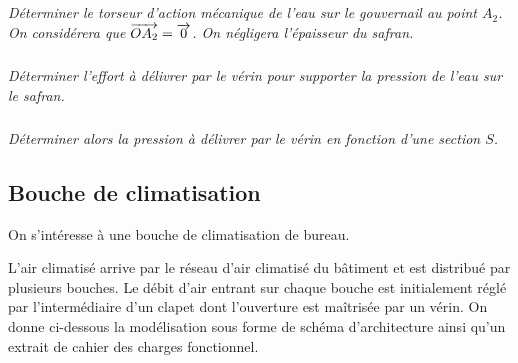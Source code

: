 \documentclass[10pt,fleqn]{article} %
\begin{document}
\begin{multicols}{2}

\subparagraph{}
\textit{Déterminer le torseur d'action mécanique de l'eau sur le gouvernail au point $A_2$. On considérera que $\overrightarrow{OA_2}=\overrightarrow{0}$. On négligera l'épaisseur du safran.} 

%
%
%
%


\subparagraph{}
\textit{Déterminer l'effort à délivrer par le vérin pour supporter la pression de l'eau sur le safran.}

\subparagraph{}
\textit{Déterminer alors la pression à délivrer par le vérin en fonction d'une section $S$.}


\subsection*{Bouche de climatisation}
\setcounter{exo}{0}
On s’intéresse à une bouche de climatisation de bureau.   

L’air climatisé arrive par le réseau d’air climatisé du bâtiment et est distribué par plusieurs bouches. Le débit d’air entrant sur chaque bouche est initialement réglé par l’intermédiaire d’un clapet dont l’ouverture est maîtrisée  par un vérin. On donne ci-dessous la modélisation sous forme de schéma d’architecture ainsi qu’un extrait de cahier des charges fonctionnel. 


\end{multicols}
\end{document}
